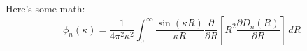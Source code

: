 \documentclass{article}
\begin{document}
Here's some math:
\[
\phi_n(\kappa) =
 \frac{1}{4\pi^2\kappa^2} \int_0^\infty
 \frac{\sin(\kappa R)}{\kappa R}
 \frac{\partial}{\partial R}
 \left[R^2\frac{\partial D_n(R)}{\partial R}\right]\,dR
\]
\end{document}
